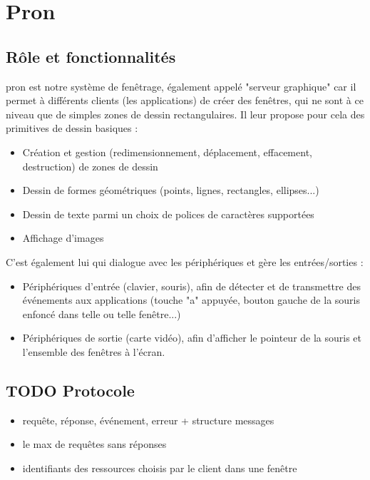 \section{Pron}

\subsection{Rôle et fonctionnalités}

pron est notre système de fenêtrage, également appelé "serveur graphique" car il permet à différents clients (les applications) de créer des fenêtres, qui ne sont à ce niveau que de simples zones de dessin rectangulaires. Il leur propose pour cela des primitives de dessin basiques :
\begin{itemize}
\item Création et gestion (redimensionnement, déplacement, effacement, destruction) de zones de dessin
\item Dessin de formes géométriques (points, lignes, rectangles, ellipses...)
\item Dessin de texte parmi un choix de polices de caractères supportées
\item Affichage d'images
\end{itemize}

\vspace{1em}

C'est également lui qui dialogue avec les périphériques et gère les entrées/sorties :
\begin{itemize}
  \item Périphériques d'entrée (clavier, souris), afin de détecter et de transmettre des événements aux applications (touche "a" appuyée, bouton gauche de la souris enfoncé dans telle ou telle fenêtre...)
  \item Périphériques de sortie (carte vidéo), afin d'afficher le pointeur de la souris et l'ensemble des fenêtres à l'écran.
\end{itemize}

\subsection{TODO Protocole}

\begin{itemize}
  \item requête, réponse, événement, erreur + structure messages
  \item le max de requêtes sans réponses
  \item identifiants des ressources choisis par le client dans une fenêtre
\end{itemize}

